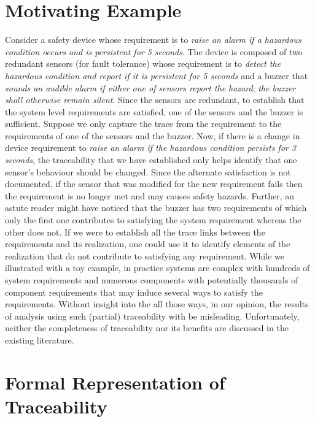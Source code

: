 \section{Motivating Example}


Consider a safety device whose requirement is to \emph{raise an alarm if a hazardous condition occurs and is persistent for 5 seconds}. The device is composed of two redundant sensors (for fault tolerance) whose requirement is to \emph{detect the hazardous condition and report if it is persistent for 5 seconds} and a buzzer that \emph{sounds an audible alarm if either one of sensors report the hazard}; \emph{the buzzer shall otherwise remain silent}. Since the sensors are redundant, to establish that the system level requirements are satisfied, one of the sensors and the buzzer is sufficient. Suppose we only capture the trace from the requirement to the requirements of one of the sensors and the buzzer. Now, if there is a change in device requirement to \emph{raise an alarm if the hazardous condition persists for 3 seconds}, the traceability that we have established only helps identify that one sensor's behaviour should be changed. Since the alternate satisfaction is not documented, if the sensor that was modified for the new requirement fails then the requirement is no longer met and may causes safety hazards. Further, an astute reader might have noticed that the buzzer has two requirements of which only the first one contributes to satisfying the system requirement whereas the other does not. If we were to establish all the trace links between the requirements and its realization, one could use it to identify elements of the realization that do not contribute to satisfying any requirement. While we illustrated with a toy example, in practice systems are complex with hundreds of system requirements and numerous components with potentially thousands of component requirements that may induce several ways to satisfy the requirements. Without insight into the all those ways, in our opinion, the results of analysis using such (partial) traceability with be misleading. Unfortunately, neither the completeness of traceability nor its benefits are discussed in the existing literature.

\section{Formal Representation of Traceability}
\label{sec:motivation}
\newcommand{\satisfies}{\vdash_{\!\!s}}
\newcommand{\nsatisfies}{\nvdash_{\!\!s}}

